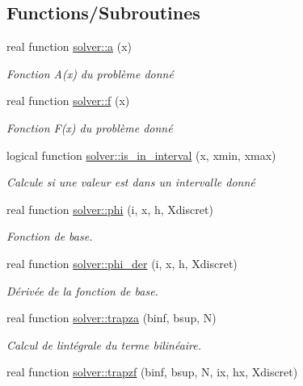 \subsection*{Functions/\+Subroutines}
\begin{DoxyCompactItemize}
\item 
real function \hyperlink{namespacesolver_ab0081bb7880652eb26e65994f13fcb54}{solver\+::a} (x)
\begin{DoxyCompactList}\small\item\em Fonction A(x) du problème donné \end{DoxyCompactList}\item 
real function \hyperlink{namespacesolver_a6f4d43c88c7c8ebdea64bd45e002af05}{solver\+::f} (x)
\begin{DoxyCompactList}\small\item\em Fonction F(x) du problème donné \end{DoxyCompactList}\item 
logical function \hyperlink{namespacesolver_a2380e35eaa6fcef040f90bb5b23baa6a}{solver\+::is\+\_\+in\+\_\+interval} (x, xmin, xmax)
\begin{DoxyCompactList}\small\item\em Calcule si une valeur est dans un intervalle donné \end{DoxyCompactList}\item 
real function \hyperlink{namespacesolver_a3323b7ad7f72685a465733177c82e8cc}{solver\+::phi} (i, x, h, Xdiscret)
\begin{DoxyCompactList}\small\item\em Fonction de base. \end{DoxyCompactList}\item 
real function \hyperlink{namespacesolver_add1e5803b09e373fde46731960030e42}{solver\+::phi\+\_\+der} (i, x, h, Xdiscret)
\begin{DoxyCompactList}\small\item\em Dérivée de la fonction de base. \end{DoxyCompactList}\item 
real function \hyperlink{namespacesolver_a5cdc774a6979796cb6b072b2fbb0e5af}{solver\+::trapza} (binf, bsup, N)
\begin{DoxyCompactList}\small\item\em Calcul de l\textquotesingle{}intégrale du terme bilinéaire. \end{DoxyCompactList}\item 
real function \hyperlink{namespacesolver_adb6590794b23eaed708cd2e42adac550}{solver\+::trapzf} (binf, bsup, N, ix, hx, Xdiscret)

\end{DoxyCompactItemize}
